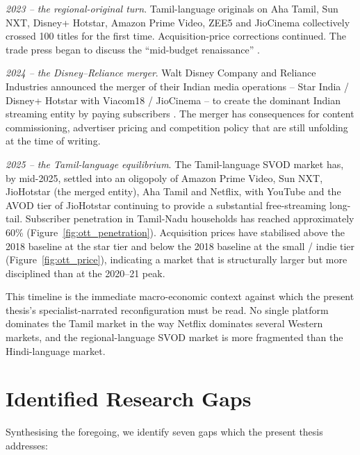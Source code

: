 \textit{2023 -- the regional-original turn}.  Tamil-language originals
on Aha Tamil, Sun NXT, Disney+ Hotstar, Amazon Prime Video, ZEE5 and
JioCinema collectively crossed 100 titles for the first time.
Acquisition-price corrections continued.  The trade press began to
discuss the ``mid-budget renaissance''
\citep{filmcompanion2022mid,behindwoods2023,galatta2023}.

\textit{2024 -- the Disney--Reliance merger}.  Walt Disney Company
and Reliance Industries announced the merger of their Indian media
operations -- Star India / Disney+ Hotstar with Viacom18 / JioCinema
-- to create the dominant Indian streaming entity by paying
subscribers \citep{economictimes2024jiomerger,thehindu2024merger}.
The merger has consequences for content commissioning, advertiser
pricing and competition policy that are still unfolding at the time
of writing.

\textit{2025 -- the Tamil-language equilibrium}.  The Tamil-language
SVOD market has, by mid-2025, settled into an oligopoly of Amazon
Prime Video, Sun NXT, JioHotstar (the merged entity), Aha Tamil and
Netflix, with YouTube and the AVOD tier of JioHotstar continuing to
provide a substantial free-streaming long-tail.  Subscriber
penetration in Tamil-Nadu households has reached approximately 60\%
(Figure~\ref{fig:ott_penetration}).  Acquisition prices have
stabilised above the 2018 baseline at the star tier and below the
2018 baseline at the small / indie tier (Figure~\ref{fig:ott_price}),
indicating a market that is structurally larger but more disciplined
than at the 2020--21 peak.

This timeline is the immediate macro-economic context against which
the present thesis's specialist-narrated reconfiguration must be
read.  No single platform dominates the Tamil market in the way
Netflix dominates several Western markets, and the regional-language
SVOD market is more fragmented than the Hindi-language market.

\section{Identified Research Gaps}
\label{sec:gap}

Synthesising the foregoing, we identify seven gaps which the present
thesis addresses:

